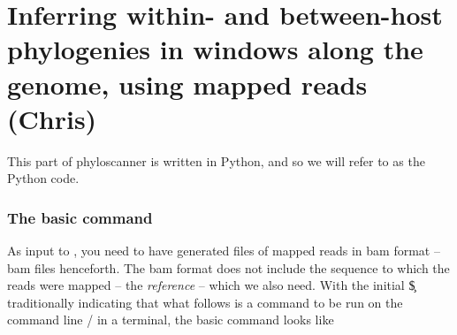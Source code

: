 \part{Inferring within- and between-host phylogenies in windows along the genome, using mapped reads (Chris)}

This part of phyloscanner is written in Python, and so we will refer to as the Python code.

\section{The basic command}

As input to \p, you need to have generated files of mapped reads in bam format -- bam files henceforth.
The bam format does not include the sequence to which the reads were mapped -- the {\it reference} -- which we also need.
With the initial \c{\$} traditionally indicating that what follows is a command to be run on the command line / in a terminal, the basic \p command looks like

